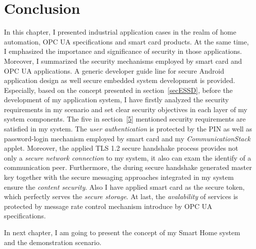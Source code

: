 \section{Conclusion}
In this chapter, I presented industrial application cases in the realm of home automation, OPC UA specifications and smart card products. At the same time, I emphasized the importance and significance of security in those applications. Moreover, I summarized the security mechanisms employed by smart card and OPC UA applications. A generic developer guide line for secure Android application design as well secure embedded system development is provided. Especially, based on the concept presented in section~\ref{secESSD}, before the development of my application system, I have firstly analyzed the security requirements in my scenario and set clear security objectives in each layer of my system components. The five in section~\ref{5} mentioned security requirements are satisfied in my system. The \emph{user authentication} is protected by the PIN as well as password-login mechanism employed by smart card and my \emph{CommunicationStack} applet. Moreover, the applied TLS 1.2 secure handshake process provides not only a \emph{secure network connection} to my system, it also can exam the identify of a communication peer. Furthermore, the during secure handshake generated master key together with the secure  messaging approaches integrated in my system  ensure the \emph{content security}. Also I have applied smart card as the secure token, which perfectly serves the \emph{secure storage}. At last, the \emph{avalability} of services is protected by message rate control mechanism introduce by OPC UA specifications.


In next chapter, I am going to present the concept of my Smart Home system and the demonstration scenario.